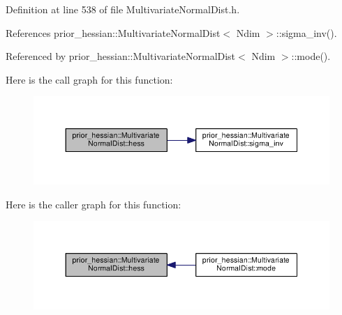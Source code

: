Definition at line 538 of file Multivariate\+Normal\+Dist.\+h.



References prior\+\_\+hessian\+::\+Multivariate\+Normal\+Dist$<$ Ndim $>$\+::sigma\+\_\+inv().



Referenced by prior\+\_\+hessian\+::\+Multivariate\+Normal\+Dist$<$ Ndim $>$\+::mode().



Here is the call graph for this function\+:\nopagebreak
\begin{figure}[H]
\begin{center}
\leavevmode
\includegraphics[width=350pt]{classprior__hessian_1_1MultivariateNormalDist_aaf8d6241c639ee69c7854f392ba85480_cgraph}
\end{center}
\end{figure}




Here is the caller graph for this function\+:\nopagebreak
\begin{figure}[H]
\begin{center}
\leavevmode
\includegraphics[width=350pt]{classprior__hessian_1_1MultivariateNormalDist_aaf8d6241c639ee69c7854f392ba85480_icgraph}
\end{center}
\end{figure}


